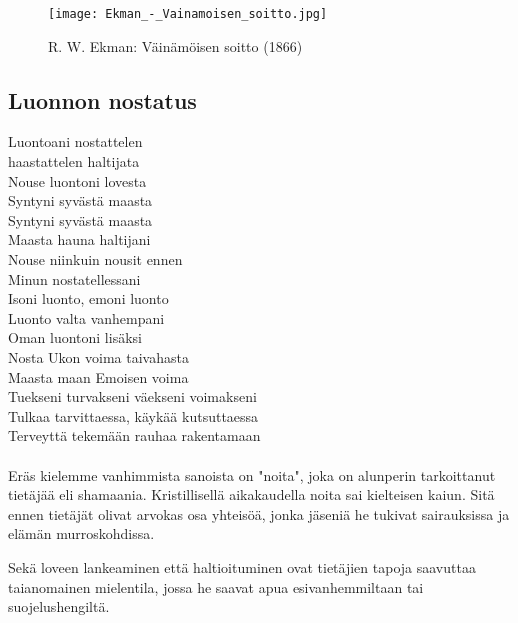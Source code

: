 
\vfill%
\begin{figure}[!ht]%
  \centering%
  \texttt{[image: Ekman\_-\_Vainamoisen\_soitto.jpg]}%
  \caption{R. W. Ekman: Väinämöisen soitto (1866)}%
\end{figure}
\vfill%


\clearpage
\subsection{Luonnon nostatus}
  \begin{large}\begin{center}\begin{em}
    Luontoani nostattelen\\
    haastattelen haltijata\\
    Nouse luontoni lovesta\\
    Syntyni syvästä maasta\\
    Syntyni syvästä maasta\\
    \vspace{1em}
    Maasta hauna haltijani\\
    Nouse niinkuin nousit ennen\\
    Minun nostatellessani\\
    \vspace{1em}
    Isoni luonto, emoni luonto\\
    Luonto valta vanhempani\\
    Oman luontoni lisäksi\\
    Nosta Ukon voima taivahasta\\
    Maasta maan Emoisen voima\\
    \vspace{1em}
    Tuekseni turvakseni väekseni voimakseni\\
    Tulkaa tarvittaessa, käykää kutsuttaessa\\
    Terveyttä tekemään rauhaa rakentamaan\\
    \vspace{1em}
  \end{em}\end{center}\end{large}

  \paragraph{}
    Eräs kielemme vanhimmista sanoista on "noita", joka on alunperin tarkoittanut tietäjää eli
    shamaania. Kristillisellä aikakaudella noita sai kielteisen kaiun. Sitä ennen tietäjät
    olivat arvokas osa yhteisöä, jonka jäseniä he tukivat sairauksissa ja elämän murroskohdissa.
    \par
    Sekä loveen lankeaminen että haltioituminen ovat tietäjien tapoja saavuttaa taianomainen
    mielentila, jossa he saavat apua esivanhemmiltaan tai suojelushengiltä.

